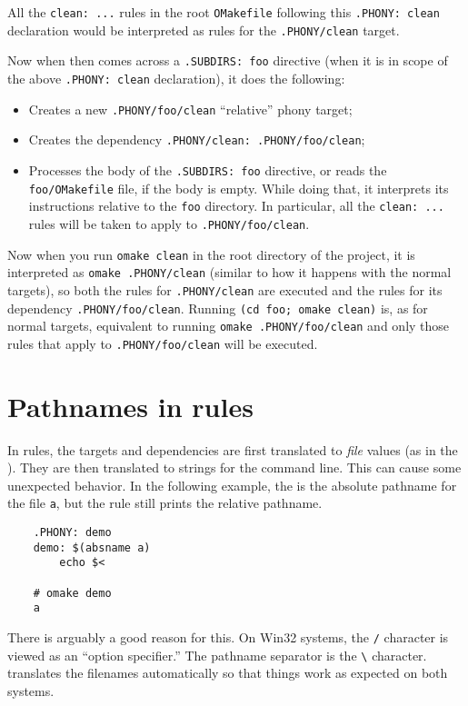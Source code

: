 All the \verb+clean: ...+ rules in the root \verb+OMakefile+ following this \verb+.PHONY: clean+
declaration would be interpreted as rules for the \verb+.PHONY/clean+ target.

Now when \OMake{} then comes across a \verb+.SUBDIRS: foo+ directive (when it is in scope of the above
\verb+.PHONY: clean+ declaration), it does the following:
\begin{itemize}
\item Creates a new \verb+.PHONY/foo/clean+ ``relative'' phony target;
\item Creates the dependency \verb+.PHONY/clean: .PHONY/foo/clean+;
\item Processes the body of the \verb+.SUBDIRS: foo+ directive, or reads the \verb+foo/OMakefile+
file, if the body is empty. While doing that, it interprets its instructions relative to the
\verb+foo+ directory. In particular, all the \verb+clean: ...+ rules will be taken to apply to
\verb+.PHONY/foo/clean+.
\end{itemize}

Now when you run \verb+omake clean+ in the root directory of the project, it is interpreted as
\verb+omake .PHONY/clean+ (similar to how it happens with the normal targets), so both the rules for
\verb+.PHONY/clean+ are executed and the rules for its dependency 
\verb+.PHONY/foo/clean+. Running \verb+(cd foo; omake clean)+ is, as for normal targets, equivalent to running
\verb+omake .PHONY/foo/clean+ and only those rules that apply to \verb+.PHONY/foo/clean+ will be executed.

\section{Pathnames in rules}

In rules, the targets and dependencies are first translated to \emph{file} values (as in the
).  They are then translated to strings for the command line.
This can cause some unexpected behavior.  In the following example, the 
is the absolute pathname for the file \verb+a+, but the rule still prints
the relative pathname.

\begin{verbatim}
    .PHONY: demo
    demo: $(absname a)
        echo $<

    # omake demo
    a
\end{verbatim}

There is arguably a good reason for this.  On Win32 systems, the \verb+/+ character is viewed as an
``option specifier.''  The pathname separator is the \verb+\+ character.  \OMake{} translates the
filenames automatically so that things work as expected on both systems.

